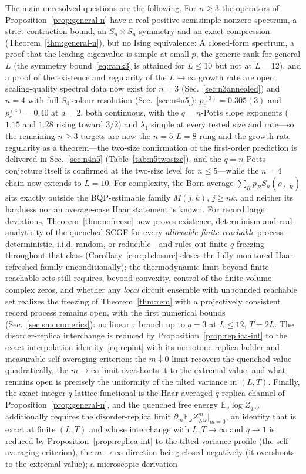 \documentclass[aps,prx,reprint,superscriptaddress,nobibnotes,longbibliography]{revtex4-2}
\theoremstyle{remark}
\newcommand{\E}{\mathbb E}
\begin{document}
The main unresolved questions are the following.  For $n\ge3$ the operators of Proposition~\ref{prop:general-n} have a real positive semisimple nonzero spectrum, a strict contraction bound, an $S_n\times S_n$ symmetry and an exact compression (Theorem~\ref{thm:general-n}), but no Ising equivalence: A closed-form spectrum, a proof that the leading eigenvalue is simple at small $p$, the generic rank for general $L$ (the symmetry bound~\eqref{eq:rank3} is attained for $L\le10$ but not at $L=12$), and a proof of the existence and regularity of the $L\to\infty$ growth rate are open; scaling-quality spectral data now exist for $n=3$ (Sec.~\ref{sec:n3annealed}) and $n=4$ with full $S_4$ colour resolution (Sec.~\ref{sec:n4n5}): $p_c^{(3)}=0.305(3)$ and $p_c^{(4)}=0.40$ at $d=2$, both continuous, with the $q=n$-Potts slope exponents ($1.15$ and $1.28$ rising toward $3/2$) and $\lambda_1$ simple at every tested size and rate—so the remaining $n\ge3$ targets are now the $n=5$ $L=8$ rung and the growth-rate regularity as a theorem---the two-size confirmation of the first-order prediction is delivered in Sec.~\ref{sec:n4n5} (Table~\ref{tab:n5twosize}), and the $q=n$-Potts conjecture itself is confirmed at the two-size level for $n\le5$---while the $n=4$ chain now extends to $L=10$.  For complexity, the Born average $\sum_Rp_RS_n(\rho_{A,R})$ sits exactly outside the BQP-estimable family $M(j,k)$, $j\ge nk$, and neither its hardness nor an average-case Haar statement is known.  For record large deviations, Theorem~\ref{thm:nofreeze} now proves existence, determinism and real-analyticity of the quenched SCGF for every \emph{allowable finite-reachable} process---deterministic, i.i.d.-random, or reducible---and rules out finite-$q$ freezing throughout that class (Corollary~\ref{cor:p1closure} closes the fully monitored Haar-refreshed family unconditionally); the thermodynamic limit beyond finite reachable sets still requires, beyond convexity, control of the finite-volume complex zeros, and whether any \emph{local} circuit ensemble with unbounded reachable set realizes the freezing of Theorem~\ref{thm:rem} with a projectively consistent record process remains open, with the first numerical bounds (Sec.~\ref{sec:smcnumerics}): no linear $\tau$ branch up to $q=3$ at $L\le12$, $T=2L$.  The disorder-replica interchange is reduced by Proposition~\ref{prop:replica-int} to the exact interpolation identity~\eqref{eq:repint} with its monotone replica ladder and measurable self-averaging criterion: the $m\downarrow0$ limit recovers the quenched value quadratically, the $m\to\infty$ limit overshoots it to the extremal value, and what remains open is precisely the uniformity of the tilted variance in $(L,T)$.  Finally, the exact integer-$q$ lattice functional is the Haar-averaged $q$-replica channel of Proposition~\ref{prop:general-n}, and the quenched free energy $\E_\omega\log Z_{q,\omega}$ additionally requires the disorder-replica limit $\partial_m\E_\omega Z_{q,\omega}^m|_{m=0}$, an identity that is exact at finite $(L,T)$ and whose interchange with $L,T\to\infty$ and $q\to1$ is reduced by Proposition~\ref{prop:replica-int} to the tilted-variance profile (the self-averaging criterion), the $m\to\infty$ direction being closed negatively (it overshoots to the extremal value); a microscopic derivation 
\end{document}
